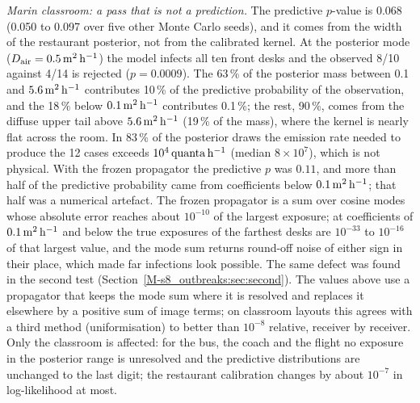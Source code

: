 \emph{Marin classroom: a pass that is not a prediction.} The predictive $p$-value is 0.068 (0.050 to 0.097
over five other Monte Carlo seeds), and it comes from the width of the restaurant posterior, not from the
calibrated kernel. At the posterior mode ($D_{\mathrm{air}}=0.5\,\mathrm{m}^2\,\mathrm{h}^{-1}$) the model infects all ten front desks and the
observed 8/10 against 4/14 is rejected ($p=0.0009$). The 63\,\% of the posterior mass between 0.1 and
$5.6\,\mathrm{m}^2\,\mathrm{h}^{-1}$ contributes 10\,\% of the predictive probability of the observation, and the 18\,\% below
$0.1\,\mathrm{m}^2\,\mathrm{h}^{-1}$ contributes 0.1\,\%; the rest, 90\,\%, comes from the diffuse upper tail above $5.6\,\mathrm{m}^2\,\mathrm{h}^{-1}$ (19\,\% of
the mass), where the kernel is nearly flat across the room. In 83\,\% of the posterior draws the emission rate
needed to produce the 12 cases exceeds $10^{4}\,\mathrm{quanta}\,\mathrm{h}^{-1}$ (median $8\times10^{7}$), which is not physical.
With the frozen propagator the predictive $p$ was $0.11$, and more than half of the predictive probability came
from coefficients below $0.1\,\mathrm{m}^2\,\mathrm{h}^{-1}$; that half was a numerical artefact. The frozen propagator is a sum over cosine modes whose absolute error reaches about $10^{-10}$ of the largest
exposure; at coefficients of $0.1\,\mathrm{m}^2\,\mathrm{h}^{-1}$ and below the true exposures of the farthest desks are $10^{-33}$ to
$10^{-16}$ of that largest value, and the mode sum returns round-off noise of either sign in their place, which made far infections
look possible. The same defect was found in the second test (Section~\ref{M-s8_outbreaks:sec:second}). The values
above use a propagator that keeps the mode sum where it is resolved and replaces it elsewhere by a positive sum
of image terms; on classroom layouts this agrees with a third method (uniformisation) to better than
$10^{-8}$ relative, receiver by receiver. Only the classroom is affected: for the bus, the coach and the
flight no exposure in the posterior range is unresolved and the predictive distributions are unchanged to the
last digit; the restaurant calibration changes by about $10^{-7}$ in log-likelihood at most.

